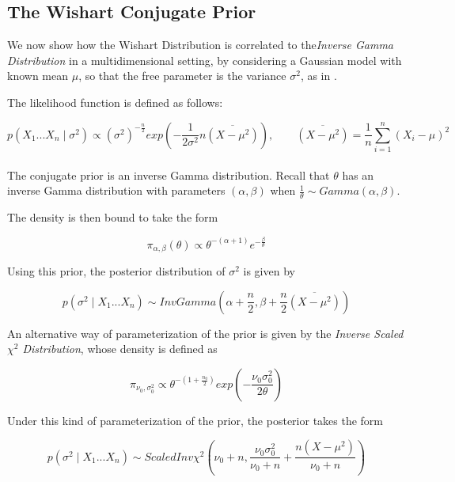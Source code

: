 \documentclass[12pt,openright,twoside,a4paper]{book}
\begin{document}
\subsection{The Wishart Conjugate Prior}

We now show how the Wishart Distribution is correlated to the\textit{Inverse Gamma Distribution} in a multidimensional setting, by  considering a Gaussian model with known mean $\mu$, so that the free parameter is the variance  $\sigma^2$, as in \cite{SML}.

The likelihood function is defined as follows:

\begin{equation}
p(X_1...X_n\mid \sigma^2)\propto (\sigma^2)^{-\frac{n}{2}}exp(-\frac{1}{2\sigma^2}n \overline{(X-\mu^2)}) , \qquad \overline{(X-\mu^2)}=\frac{1}{n}\sum_{i=1}^n(X_i-\mu)^2
\label{gausslike}
\end{equation}
\\[12pt]

The conjugate prior is an inverse Gamma distribution. Recall that $\theta$ has an inverse Gamma distribution with parameters $(\alpha,\beta)$   when $\frac{1}{\theta}\sim Gamma(\alpha,\beta)$.

The density is then bound to take the form 

\begin{equation}
\pi_{\alpha,\beta}(\theta)\propto \theta^{-(\alpha+1)}e^{-\frac{\beta}{\theta}}
\end{equation}

Using this prior, the posterior distribution of $\sigma^2$ is given by

\begin{equation}
p( \sigma^2 \mid X_1...X_n)\sim InvGamma(\alpha + \frac{n}{2}, \beta + \frac{n}{2} \overline{(X-\mu^2)})
\end{equation}

An alternative way of parameterization of the prior is given by the \textit{Inverse Scaled $\chi^2$ Distribution}, whose density is defined as

\begin{equation}
\pi_{\nu_0, \sigma_0^2}\propto \theta^{-(1+ \frac{n_0}{2})}exp(-\frac{\nu_0 \sigma_0^2}{2\theta})
\end{equation}

Under this kind of parameterization of the prior, the posterior takes the form

\begin{equation}
p(\sigma^2 \mid X_1...X_n)\sim ScaledInv\chi^2(\nu_0+n, \frac{\nu_0 \sigma_0^2}{\nu_0 + n} + \frac{n(X-\mu^2)}{\nu_0 + n})
\end{equation}
\end{document}
